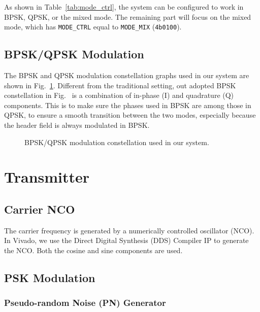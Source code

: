 \documentclass[journal,twoside]{IEEEtran}
\begin{document}
      As shown in Table~\ref{tab:mode_ctrl},
      the system can be configured to work in BPSK, QPSK, or the mixed mode.
      The remaining part will focus on the mixed mode,
      which has \texttt{MODE\_CTRL} equal to \texttt{MODE\_MIX} (\texttt{4\textquotesingle b0100}).

    \subsection{BPSK/QPSK Modulation}

      The BPSK and QPSK modulation constellation graphs used in our system are shown in Fig.~\ref{fig:constellation}.
      Different from the traditional setting, out adopted BPSK constellation in Fig.~
      is a combination of in-phase (I) and quadrature (Q) components.
      This is to make sure the phases used in BPSK are among those in QPSK,
      to ensure a smooth transition between the two modes,
      especially because the header field is always modulated in BPSK.
      \begin{figure}[htbp]
        \hfill%
        \caption{BPSK/QPSK modulation constellation used in our system.}
        \label{fig:constellation}
      \end{figure}

    \section{Transmitter}

    \subsection{Carrier NCO}

      The carrier frequency is generated by a numerically controlled oscillator (NCO).
      In Vivado, we use the Direct Digital Synthesis (DDS) Compiler IP \cite{xilinx:pg141} to generate the NCO.
      Both the cosine and sine components are used.

  \subsection{PSK Modulation}

    \subsubsection{Pseudo-random Noise (PN) Generator}
\end{document}
